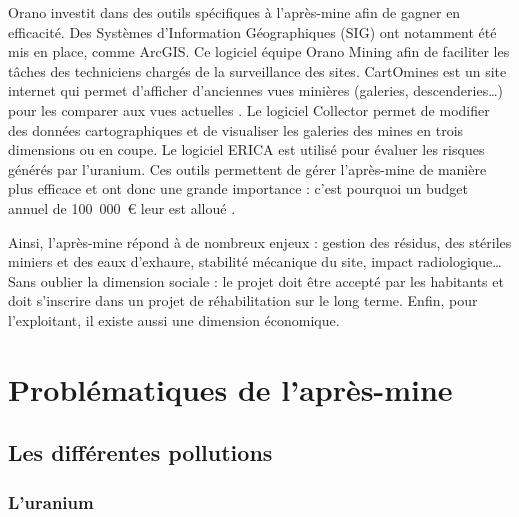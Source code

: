\documentclass{article}
\begin{document}
Orano investit dans des outils spécifiques à l’après-mine afin de gagner en efficacité. Des Systèmes d’Information Géographiques (SIG) ont notamment été mis en place, comme ArcGIS. Ce logiciel équipe Orano Mining afin de faciliter les tâches des techniciens chargés de la surveillance des sites.
CartOmines est un site internet qui permet d’afficher d’anciennes vues minières (galeries, descenderies…) pour les comparer aux vues actuelles \cite{noauthor_cartomines_nodate}. Le logiciel Collector permet de modifier des données cartographiques et de visualiser les galeries des mines en trois dimensions ou en coupe. Le logiciel ERICA est utilisé pour évaluer les risques générés par l’uranium. Ces outils permettent de gérer l’après-mine de manière plus efficace et ont donc une grande importance : c’est pourquoi un budget annuel de 100~000~\euro{} leur est alloué \cite{gerland_outils_2020}.

Ainsi, l’après-mine répond à de nombreux enjeux : gestion des résidus, des stériles miniers et des eaux d’exhaure, stabilité mécanique du site, impact radiologique… Sans oublier la dimension sociale : le projet doit être accepté par les habitants et doit s’inscrire dans un projet de réhabilitation sur le long terme. Enfin, pour l’exploitant, il existe aussi une dimension économique.


\newpage
\section{Problématiques de l’après-mine}
\subsection{Les différentes pollutions}
\subsubsection{L'uranium}
\end{document}
